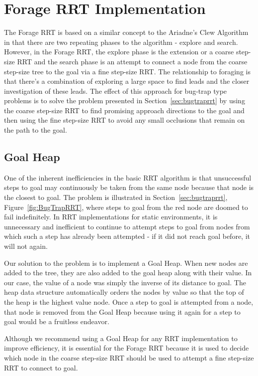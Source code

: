 \documentclass[conference]{IEEEtran}
\begin{document}
\section{Forage RRT Implementation}
The Forage RRT is based on a similar concept to the Ariadne's Clew Algorithm \cite{bessiere93} in that there are two repeating phases to the
algorithm - explore and search. However, in the Forage RRT, the explore phase is the extension or a coarse step-size RRT and the search phase
is an attempt to connect a node from the coarse step-size tree to the goal via a fine step-size RRT. The relationship to foraging is that
there's a combination of exploring a large space to find leads and the closer investigation of these leads. The effect of this approach for
bug-trap type problems is to solve the problem presented in Section~\ref{sec:bugtraprrt} by using the coarse step-size RRT to find
promising approach directions to the goal and then using the fine step-size RRT to avoid any small occlusions that remain on the path to the
goal.

\subsection{Goal Heap}
One of the inherent inefficiencies in the basic RRT algorithm is that unsuccessful steps to goal may continuously be taken from the same
node because that node is the closest to goal. The problem is illustrated in Section~\ref{sec:bugtraprrt}, Figure~\ref{fig:BugTrapRRT},
where steps to goal from the red node are doomed to fail indefinitely. In RRT implementations for static environments, it is unnecessary and
inefficient to continue to attempt steps to goal from nodes from which such a step has already been attempted - if it did not reach goal
before, it will not again. 

Our solution to the problem is to implement a Goal Heap. When new nodes are added to the tree, they are also added to the goal heap along
with their value. In our case, the value of a node was simply the inverse of its distance to goal. The heap data structure automatically
orders the nodes by value so that the top of the heap is the highest value node. Once a step to goal is attempted from a node, that node is
removed from the Goal Heap because using it again for a step to goal would be a fruitless endeavor.

Although we recommend using a Goal Heap for any RRT implementation to improve efficiency, it is essential for the Forage RRT because it is
used to decide which node in the coarse step-size RRT should be used to attempt a fine step-size RRT to connect to goal.
\end{document}

